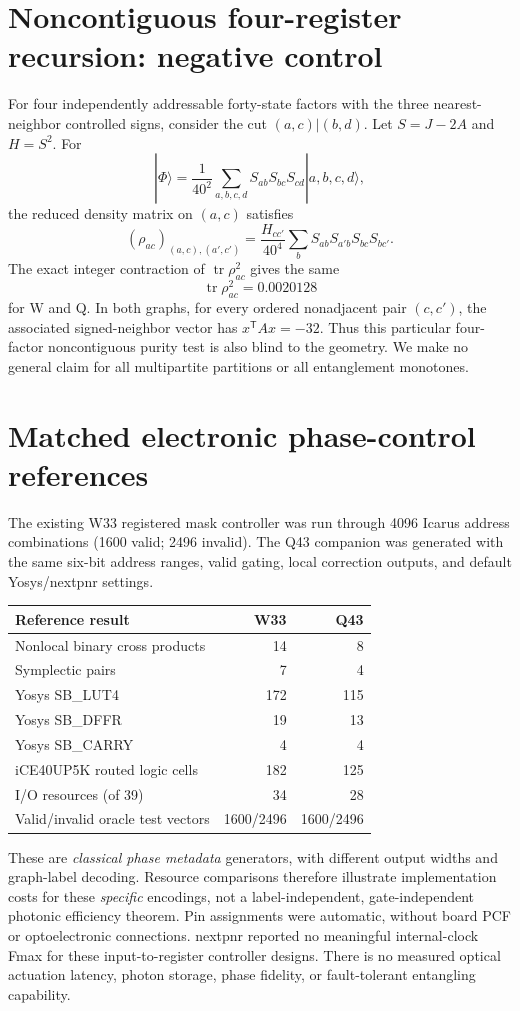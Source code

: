 \documentclass[10pt]{article}
\begin{document}
\section{Noncontiguous four-register recursion: negative control}
For four independently addressable forty-state
factors with the three nearest-neighbor
controlled signs, consider the cut $(a,c)|(b,d)$.
Let $S=J-2A$ and $H=S^2$. For
\[
|\Phi\rangle=\frac1{40^2}
\sum_{a,b,c,d}S_{ab}S_{bc}S_{cd}|a,b,c,d\rangle,
\]
the reduced density matrix on $(a,c)$ satisfies
\[
(\rho_{ac})_{(a,c),(a',c')}=
\frac{H_{cc'}}{40^4}
\sum_b S_{ab}S_{a'b}S_{bc}S_{bc'}.
\]
The exact integer contraction of
$\operatorname{tr}\rho_{ac}^2$ gives the same
\[
\boxed{\operatorname{tr}\rho_{ac}^2=0.0020128}
\]
for W and Q. In both graphs, for every ordered
nonadjacent pair $(c,c')$, the associated
signed-neighbor vector has $x^{\mathsf T}Ax=-32$.
Thus this particular four-factor
noncontiguous purity test is also blind
to the geometry. We make no general claim
for all multipartite partitions or all
entanglement monotones.

\section{Matched electronic phase-control references}
The existing W33 registered mask controller
was run through 4096 Icarus address combinations
(1600 valid; 2496 invalid). The Q43 companion
was generated with the same six-bit address
ranges, valid gating, local correction outputs,
and default Yosys/nextpnr settings.
\begin{center}
\begin{tabular}{lrr}
\toprule
Reference result & W33 & Q43\\
\midrule
Nonlocal binary cross products&14&8\\
Symplectic pairs&7&4\\
Yosys SB\_LUT4&172&115\\
Yosys SB\_DFFR&19&13\\
Yosys SB\_CARRY&4&4\\
iCE40UP5K routed logic cells&182&125\\
I/O resources (of 39)&34&28\\
Valid/invalid oracle test vectors&1600/2496&1600/2496\\
\bottomrule
\end{tabular}
\end{center}
These are \emph{classical phase metadata}
generators, with different output widths and
graph-label decoding. Resource comparisons
therefore illustrate implementation costs
for these \emph{specific} encodings, not
a label-independent, gate-independent
photonic efficiency theorem. Pin assignments
were automatic, without board PCF or
optoelectronic connections. nextpnr reported
no meaningful internal-clock Fmax for
these input-to-register controller designs.
There is no measured optical actuation
latency, photon storage, phase fidelity, or
fault-tolerant entangling capability.
\end{document}
